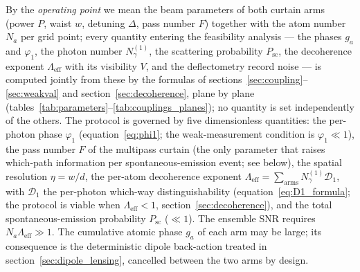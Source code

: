 \documentclass[11pt,a4paper]{article}
\begin{document}
By the \emph{operating point} we mean the beam parameters of both curtain arms (power $P$, waist $w$, detuning $\Delta$, pass number $F$) together with the atom number $N_a$ per grid point; every quantity entering the feasibility analysis --- the phases $g_a$ and $\varphi_1$, the photon number $N_\gamma^{(1)}$, the scattering probability $P_\text{sc}$, the decoherence exponent $\Lambda_\text{eff}$ with its visibility $V$, and the deflectometry record noise --- is computed jointly from these by the formulas of sections~\ref{sec:coupling}--\ref{sec:weakval} and section~\ref{sec:decoherence}, plane by plane (tables~\ref{tab:parameters}--\ref{tab:couplings_planes}); no quantity is set independently of the others. The protocol is governed by five dimensionless quantities: the per-photon phase $\varphi_1$ (equation~\eqref{eq:phi1}; the weak-measurement condition is $\varphi_1 \ll 1$), the pass number $F$ of the multipass curtain (the only parameter that raises which-path information per spontaneous-emission event; see below), the spatial resolution $\eta = w/d$, the per-atom decoherence exponent $\Lambda_\text{eff} = \sum_\text{arms} N_\gamma^{(1)}\mathcal{D}_1$, with $\mathcal{D}_1$ the per-photon which-way distinguishability (equation~\eqref{eq:D1_formula}; the protocol is viable when $\Lambda_\text{eff} < 1$, section~\ref{sec:decoherence}), and the total spontaneous-emission probability $P_\text{sc}$ ($\ll 1$). The ensemble SNR requires $N_a\Lambda_\text{eff} \gg 1$. The cumulative atomic phase $g_a$ of each arm may be large; its consequence is the deterministic dipole back-action treated in section~\ref{sec:dipole_lensing}, cancelled between the two arms by design.
\end{document}
